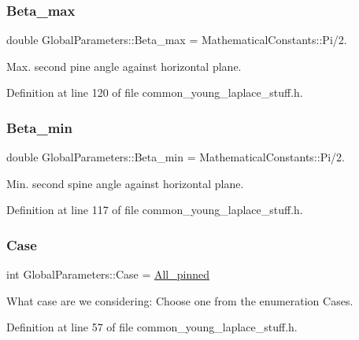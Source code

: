 \subsubsection{\texorpdfstring{Beta\+\_\+max}{Beta\_max}}
{\footnotesize\ttfamily double Global\+Parameters\+::\+Beta\+\_\+max = Mathematical\+Constants\+::\+Pi/2.}



Max. second pine angle against horizontal plane. 



Definition at line 120 of file common\+\_\+young\+\_\+laplace\+\_\+stuff.\+h.

\mbox{\label{namespaceGlobalParameters_aeb7f1ae574be563e0b603662c6fff5aa}} 
\subsubsection{\texorpdfstring{Beta\+\_\+min}{Beta\_min}}
{\footnotesize\ttfamily double Global\+Parameters\+::\+Beta\+\_\+min = Mathematical\+Constants\+::\+Pi/2.}



Min. second spine angle against horizontal plane. 



Definition at line 117 of file common\+\_\+young\+\_\+laplace\+\_\+stuff.\+h.

\mbox{\label{namespaceGlobalParameters_aeb4257eec7a4c5a92e2b88e93248a201}} 
\subsubsection{\texorpdfstring{Case}{Case}}
{\footnotesize\ttfamily int Global\+Parameters\+::\+Case = \hyperlink{namespaceGlobalParameters_adde04e4243b82e3d4bd2f82d37a2d6bfa28147edc9cfc06038f2a7deaf8890558}{All\+\_\+pinned}}



What case are we considering\+: Choose one from the enumeration Cases. 



Definition at line 57 of file common\+\_\+young\+\_\+laplace\+\_\+stuff.\+h.



